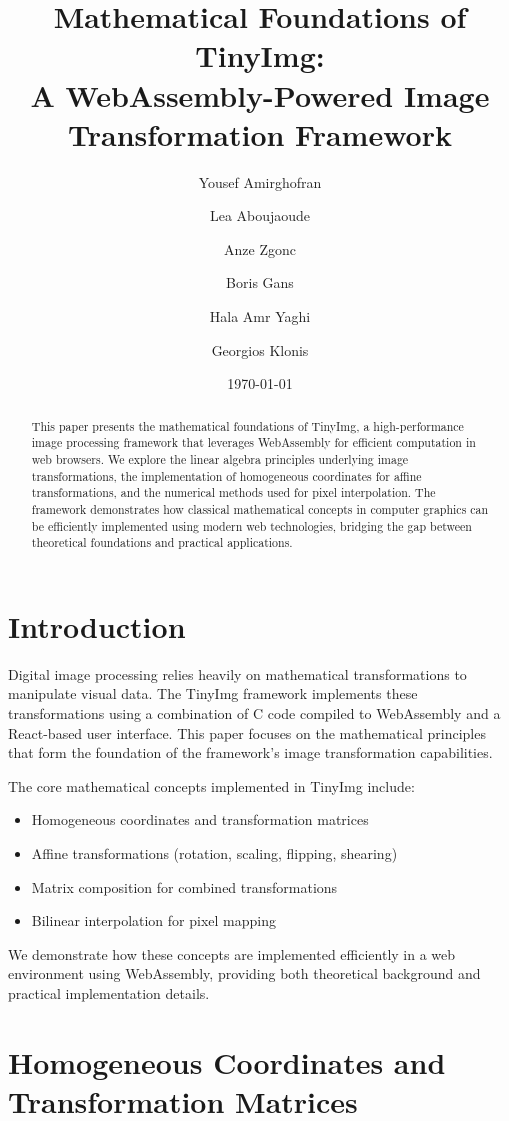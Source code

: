 \documentclass{article}
\title{Mathematical Foundations of TinyImg: \\
A WebAssembly-Powered Image Transformation Framework}
\author{Yousef Amirghofran \and Lea Aboujaoude \and Anze Zgonc \and Boris Gans \and Hala Amr Yaghi \and Georgios Klonis}
\date{\today}
\begin{document}
\maketitle

\begin{abstract}
This paper presents the mathematical foundations of TinyImg, a high-performance image processing framework that leverages WebAssembly for efficient computation in web browsers. We explore the linear algebra principles underlying image transformations, the implementation of homogeneous coordinates for affine transformations, and the numerical methods used for pixel interpolation. The framework demonstrates how classical mathematical concepts in computer graphics can be efficiently implemented using modern web technologies, bridging the gap between theoretical foundations and practical applications.
\end{abstract}

\section{Introduction}

Digital image processing relies heavily on mathematical transformations to manipulate visual data. The TinyImg framework implements these transformations using a combination of C code compiled to WebAssembly and a React-based user interface. This paper focuses on the mathematical principles that form the foundation of the framework's image transformation capabilities.

The core mathematical concepts implemented in TinyImg include:

\begin{itemize}
    \item Homogeneous coordinates and transformation matrices
    \item Affine transformations (rotation, scaling, flipping, shearing)
    \item Matrix composition for combined transformations
    \item Bilinear interpolation for pixel mapping
\end{itemize}

We demonstrate how these concepts are implemented efficiently in a web environment using WebAssembly, providing both theoretical background and practical implementation details.

\section{Homogeneous Coordinates and Transformation Matrices}
\end{document}
